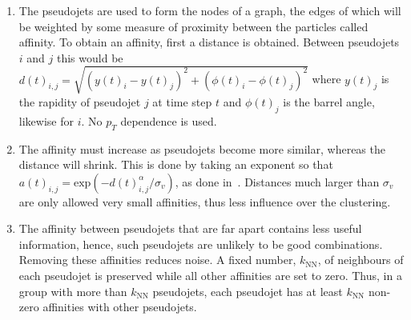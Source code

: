     \begin{enumerate}
        \item \label{step:start} The pseudojets are used to form the nodes of a graph,
        the edges of which will be weighted by some measure of proximity between the particles called affinity.
        To obtain an affinity, first a distance is obtained.
        Between pseudojets \(i\) and \(j\) this would be \(d(t)_{i,j} = \sqrt{(y(t)_i - y(t)_j)^2 + (\phi(t)_i - \phi(t)_j)^2}\)
        where \(y(t)_j\) is the rapidity of pseudojet \(j\) at time step \(t\) and \(\phi(t)_j\) is the barrel angle, likewise for \(i\).
        No \(p_T\) dependence is used.

    \item \label{step:affinity} The affinity must increase as pseudojets become more similar, whereas the distance will shrink.
        This is done by taking an exponent so that \(a(t)_{i,j} = \text{exp}(-d(t)_{i,j}^\alpha/\sigma_v)\), as done in~\cite{hadjighasem2016votex}.
            Distances much larger than \(\sigma_v\) are only allowed very small affinities,
            thus less influence over the clustering.

    \item\label{step:KNN} The affinity between pseudojets that are far apart contains less useful information, hence,
        such pseudojets are unlikely to be good combinations.
        Removing these affinities reduces noise.
    A fixed number, \(k_\text{NN}\), of neighbours of each pseudojet is 
    preserved while all other affinities are set to zero.
    Thus, in a group with more than \(k_\text{NN}\) pseudojets,
    each pseudojet has at least \(k_\text{NN}\) non-zero affinities with other pseudojets.


\end{enumerate}
